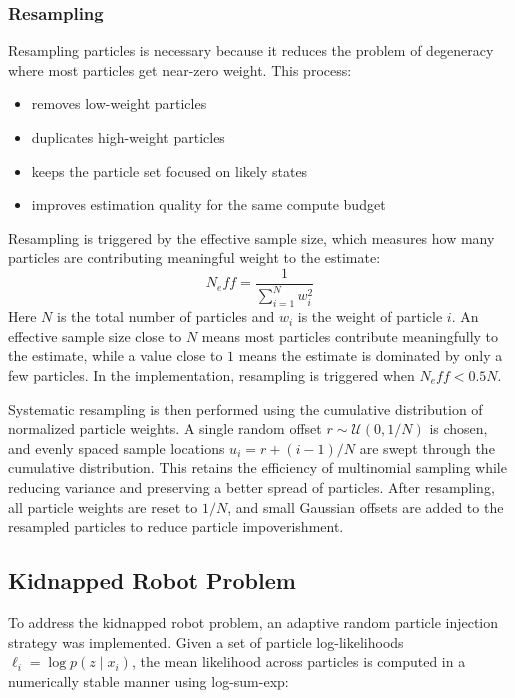 \documentclass[11pt]{article}
\begin{document}
\subsubsection{Resampling}
Resampling particles is necessary because it reduces the problem of degeneracy where most particles get near-zero weight. This process:
\begin{itemize}
    \item removes low-weight particles
    \item duplicates high-weight particles
    \item keeps the particle set focused on likely states
    \item improves estimation quality for the same compute budget
\end{itemize}

\noindent Resampling is triggered by the effective sample size, which measures how many particles are contributing
          meaningful weight to the estimate:
\[
N_eff = \frac{1}{\sum_{i=1}^{N}w_i^2}
\]
\noindent Here \(N\) is the total number of particles and \(w_i\) is the weight of particle \(i\). An effective sample
          size close to \(N\) means most particles contribute meaningfully to the estimate, while a value close to \(1\)
          means the estimate is dominated by only a few particles. In the implementation, resampling is triggered when
          \(N_eff < 0.5N\).

\noindent Systematic resampling is then performed using the cumulative distribution of normalized particle weights. A
          single random offset \(r \sim \mathcal{U}(0,1/N)\) is chosen, and evenly spaced sample locations \(u_i = r +
          (i-1)/N\) are swept through the cumulative distribution. This retains the efficiency of multinomial sampling
          while reducing variance and preserving a better spread of particles. After resampling, all particle weights
          are reset to \(1/N\), and small Gaussian offsets are added to the resampled particles to reduce particle
          impoverishment.

\subsection{Kidnapped Robot Problem}

To address the kidnapped robot problem, an adaptive random particle injection strategy was implemented. Given a set of
particle log-likelihoods \(\ell_i = \log p(z \mid x_i)\), the mean likelihood across particles is computed in a
numerically stable manner using log-sum-exp:
\end{document}
